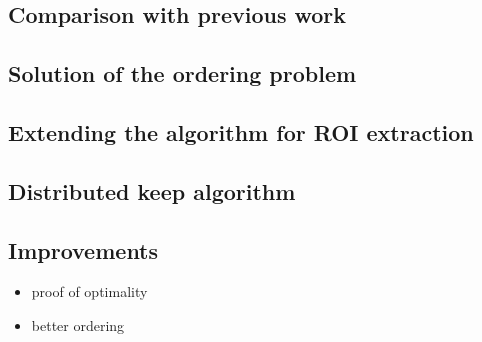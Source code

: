 \documentclass[conference]{IEEEtran}
\begin{document}
\subsection{Comparison with previous work}
\subsection{Solution of the ordering problem}
\subsection{Extending the algorithm for ROI extraction}
\subsection{Distributed keep algorithm}
\subsection{Improvements}

\begin{itemize}
  \item proof of optimality
  \item better ordering
\end{itemize}
\end{document}
